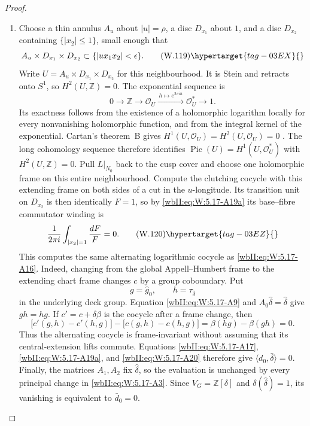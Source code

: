 \begin{proof}
\begin{enumerate}[label=\arabic*.,leftmargin=*]
\item Choose a thin annulus \(A_u\) about \(|u|=\rho\), a disc \(D_{x_1}\)
about \(1\), and a disc \(D_{x_2}\) containing \(\{|x_2|\le1\}\), small
enough that
\[
 A_u\times D_{x_1}\times D_{x_2}
 \subset\{|ux_1x_2|<\epsilon\}.
\tag{W.119}\hypertarget{tag-03EX}{}\label{wbII:eq:W:5.17-A19c}
\]
Write \(U=A_u\times D_{x_1}\times D_{x_2}\) for this neighbourhood.
It is Stein and retracts onto \(S^1\), so \(H^2(U,\mathbb Z)=0\).
The exponential sequence is
\[
0\longrightarrow\mathbb Z\longrightarrow\mathcal O_U
 \xrightarrow{\,h\mapsto e^{2\pi i h}\,}\mathcal O_U^*
 \longrightarrow1.
\]
Its exactness follows from the existence of a holomorphic logarithm locally
for every nonvanishing holomorphic function, and from the integral kernel
of the exponential. Cartan's theorem~B gives
\(H^1(U,\mathcal O_U)=H^2(U,\mathcal O_U)=0\)
\cite[\S2, fundamental theorem~B, p.~80]{Cartan1957}.
The long cohomology sequence therefore identifies
\(\operatorname{Pic}(U)=H^1(U,\mathcal O_U^*)\) with
\(H^2(U,\mathbb Z)=0\). Pull \(L|_{N_0}\) back to
the cusp cover and choose one holomorphic frame on this entire
neighbourhood.  Compute the clutching cocycle with this extending frame on
both sides of a cut in the \(u\)-longitude.  Its transition unit on
\(D_{x_2}\) is then identically \(F=1\), so by \eqref{wbII:eq:W:5.17-A19a} its
base--fibre commutator winding is
\[
 \frac1{2\pi i}\int_{|x_2|=1}\frac{dF}{F}=0.
\tag{W.120}\hypertarget{tag-03EZ}{}\label{wbII:eq:W:5.17-A20}
\]
This computes the same alternating logarithmic cocycle as \eqref{wbII:eq:W:5.17-A16}.
Indeed, changing from the global Appell--Humbert frame to the extending
chart frame changes \(c\) by a group coboundary.  Put
\[
 g=\widehat g_0,
 \qquad
 h=\tau_{\widehat\delta}
\]
in the underlying deck group.  Equation \eqref{wbII:eq:W:5.17-A9} and
\(A_0\widehat\delta=\widehat\delta\) give \(gh=hg\).  If
\(c'=c+\delta\beta\) is the cocycle after a frame change, then
\[
 \bigl[c'(g,h)-c'(h,g)\bigr]
 -\bigl[c(g,h)-c(h,g)\bigr]
 =\beta(hg)-\beta(gh)=0.
\]
Thus the alternating cocycle is frame-invariant without assuming that its
central-extension lifts commute.  Equations \eqref{wbII:eq:W:5.17-A17}, \eqref{wbII:eq:W:5.17-A19a}, and
\eqref{wbII:eq:W:5.17-A20} therefore give
\(\langle d_0,\widehat\delta\rangle=0\).
Finally, the matrices \(A_1,A_2\) fix
\(\widehat\delta\), so the evaluation is unchanged by every principal
change in \eqref{wbII:eq:W:5.17-A3}.  Since
\(V_G=\mathbb Z[\delta]\) and
\(\delta(\widehat\delta)=1\), its vanishing is equivalent to
\(\bar d_0=0\).

\end{enumerate}
\end{proof}
